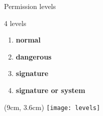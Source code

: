 \begin{frame}[fragile]{Permission levels}
  
  
  4 levels
  
  \vspace*{0.5cm}

  \begin{center}
  \begin{enumerate}
    \item \textbf{normal}\\

    \vspace*{0.2cm}    

    \item \textbf{dangerous}\\

    \vspace*{0.2cm}
    
    \item \textbf{signature}\\

    \vspace*{0.2cm}
    
    \item \textbf{signature or system}\\
  \end{enumerate}

  \begin{textblock*}{1cm}(9cm, 3.6cm)
    \texttt{[image: levels]}
  \end{textblock*}

  \end{center}
\end{frame}
